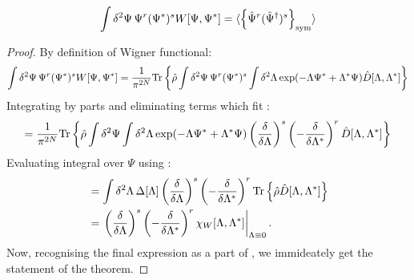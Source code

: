 \begin{theorem}
\label{thm:formalism:func-wigner:moments}
\[
	\int \delta^2\Psi\, \Psi^r (\Psi^*)^s W[\Psi, \Psi^*]
	= \langle \left\{  \hat{\Psi}^r (\hat{\Psi}^\dagger)^s  \right\}_{\mathrm{sym}} \rangle
\]
\end{theorem}
\begin{proof}
By definition of Wigner functional:
\begin{equation*}
\begin{split}
	\int \delta^2\Psi\, \Psi^r (\Psi^*)^s W[\Psi, \Psi^*]
	= \frac{1}{\pi^{2N}} \mathrm{Tr} \left\{  \hat{\rho}
		\int \delta^2\Psi\, \Psi^r (\Psi^*)^s
		\int \delta^2\Lambda \exp(-\Lambda \Psi^* + \Lambda^* \Psi)
		\hat{D}[\Lambda, \Lambda^*]
	 \right\}
\end{split}
\end{equation*}
Integrating by parts and eliminating terms which fit :
\[
	= \frac{1}{\pi^{2N}} \mathrm{Tr} \left\{  \hat{\rho}
		\int \delta^2\Psi \int \delta^2\Lambda
		\exp(-\Lambda \Psi^* + \Lambda^* \Psi)
		\left( \frac{\delta}{\delta \Lambda} \right)^s
		\left( -\frac{\delta}{\delta \Lambda^*} \right)^r
		\hat{D}[\Lambda, \Lambda^*]
	 \right\}
\]
Evaluating integral over $\Psi$ using :
\begin{equation*}
\begin{split}
	& = \int \delta^2\Lambda\,
		\Delta[\Lambda]
		\left( \frac{\delta}{\delta \Lambda} \right)^s
		\left( -\frac{\delta}{\delta \Lambda^*} \right)^r
		\mathrm{Tr} \left\{ 
			\hat{\rho}
			\hat{D}[\Lambda, \Lambda^*]
		 \right\} \\
	& = \left.
		\left( \frac{\delta}{\delta \Lambda} \right)^s
		\left( -\frac{\delta}{\delta \Lambda^*} \right)^r
		\chi_W [\Lambda, \Lambda^*]
	\right|_{\Lambda \equiv 0}.
\end{split}
\end{equation*}
Now, recognising the final expression as a part of ,
we immideately get the statement of the theorem.
\end{proof}
